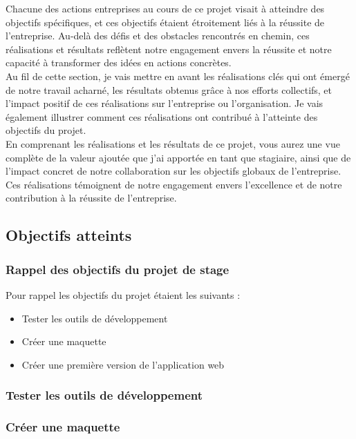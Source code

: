 \documentclass[a4paper, 12pt, french]{article}
\newcommand{\bdot}{\item[\color{ssiYellow}\ding{108}]}
\begin{document}
			Chacune des actions entreprises au cours de ce projet visait à atteindre des objectifs spécifiques, et ces objectifs étaient étroitement liés à la réussite de l'entreprise. Au-delà des défis et des obstacles rencontrés en chemin, ces réalisations et résultats reflètent notre engagement envers la réussite et notre capacité à transformer des idées en actions concrètes.\\

			Au fil de cette section, je vais mettre en avant les réalisations clés qui ont émergé de notre travail acharné, les résultats obtenus grâce à nos efforts collectifs, et l'impact positif de ces réalisations sur l'entreprise ou l'organisation. Je vais également illustrer comment ces réalisations ont contribué à l'atteinte des objectifs du projet.\\

			En comprenant les réalisations et les résultats de ce projet, vous aurez une vue complète de la valeur ajoutée que j'ai apportée en tant que stagiaire, ainsi que de l'impact concret de notre collaboration sur les objectifs globaux de l'entreprise. Ces réalisations témoignent de notre engagement envers l'excellence et de notre contribution à la réussite de l'entreprise.

			\subsection{Objectifs atteints}
				\subsubsection{Rappel des objectifs du projet de stage}
					Pour rappel les objectifs du projet étaient les suivants :
					\begin{itemize}
						\bdot{Tester les outils de développement}
						\bdot{Créer une maquette}
						\bdot{Créer une première version de l'application web}
					\end{itemize}
					
				\subsubsection{Tester les outils de développement}
				
				\subsubsection{Créer une maquette}
				
\end{document}

